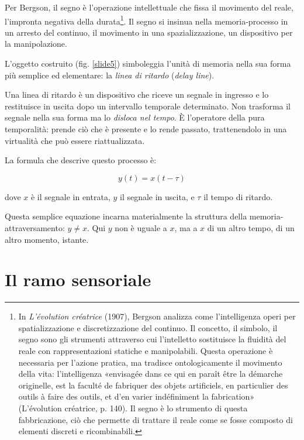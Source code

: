 Per Bergson, il segno è l'operazione intellettuale che fissa il movimento del reale, l'impronta negativa della durata\footnote{%
  In \emph{L'évolution créatrice} (1907), Bergson analizza come l'intelligenza operi per spatializzazione e discretizzazione del continuo. Il concetto, il simbolo, il segno sono gli strumenti attraverso cui l'intelletto sostituisce la fluidità del reale con rappresentazioni statiche e manipolabili. Questa operazione è necessaria per l'azione pratica, ma tradisce ontologicamente il movimento della vita: l'intelligenza «envisagée dans ce qui en paraît être la démarche originelle, est la faculté de fabriquer des objets artificiels, en particulier des outils à faire des outils, et d'en varier indéfiniment la fabrication» (L'évolution créatrice, p. 140). Il segno è lo strumento di questa fabbricazione, ciò che permette di trattare il reale come se fosse composto di elementi discreti e ricombinabili.
}. Il segno si insinua nella memoria-processo in un arresto del continuo, il movimento in una spazializzazione, un dispositivo per la manipolazione.

L'oggetto costruito (fig. \ref{slide5}) simboleggia l'unità di memoria nella sua forma più semplice ed elementare: la \emph{linea di ritardo} (\emph{delay line}).

Una linea di ritardo è un dispositivo che riceve un segnale in ingresso e lo restituisce in uscita dopo un intervallo temporale determinato. Non trasforma il segnale nella sua forma ma lo \emph{disloca nel tempo}. È l'operatore della pura temporalità: prende ciò che è presente e lo rende passato, trattenendolo in una virtualità che può essere riattualizzata.

La formula che descrive questo processo è:

\begin{equation}
y(t) = x(t - \tau)
\end{equation}

dove $x$ è il segnale in entrata, $y$ il segnale in uscita, e $\tau$ il tempo di ritardo.

Questa semplice equazione incarna materialmente la struttura della memoria-attraversamento: $y \neq x$. Qui $y$ non è uguale a $x$, ma a $x$ di un altro tempo, di un altro momento, istante.

\section{Il ramo sensoriale}

